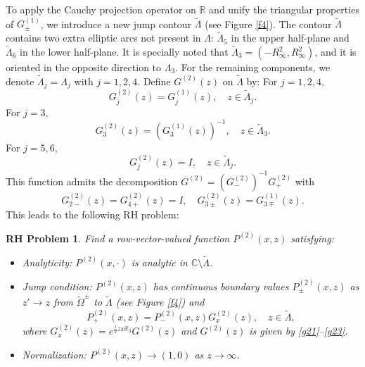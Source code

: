 \documentclass[preprint,compress,12pt]{elsarticle}
\newtheorem{rhp}{RH Problem}
\numberwithin{equation}{section}
\begin{document}
To apply the Cauchy projection operator on $\mathbb{R}$ and unify the triangular properties of $G^{(1)}_{\pm}$, we introduce a new jump contour $\widetilde{\Lambda}$ (see Figure \ref{f4}). The contour $\widetilde{\Lambda}$ contains two extra elliptic arcs not present in $\Lambda$: $\widetilde{\Lambda}_{5}$ in the upper half-plane and $\widetilde{\Lambda}_{6}$ in the lower half-plane. It is specially noted that \(\widetilde{\Lambda}_{3}=\left(-R_{\infty}^{2},R_{\infty}^{2}\right)\), and it is oriented in the opposite direction to $\Lambda_{3}$. For the remaining components, we denote $\widetilde{\Lambda}_{j}=\Lambda_{j}$ with $j=1,2,4$.  Define $G^{(2)}(z)$ on $\widetilde{\Lambda}$ by:
For $j=1,2,4$,
\begin{equation}\label{g21}
G_{j}^{(2)}(z)=G_{j}^{(1)}(z),\quad z\in\widetilde{\Lambda}_{j}.
\end{equation}
For $j=3$,
\begin{equation}\label{g22}
G_{3}^{(2)}(z)=(G_{3}^{(1)}(z))^{-1},\quad z\in\widetilde{\Lambda}_{3}.
\end{equation}
For $j=5,6$,
\begin{equation}\label{g23}
G_{j}^{(2)}(z)=I,\quad z\in\widetilde{\Lambda}_{j}.
\end{equation}
This function admits the decomposition $G^{(2)}=(G^{(2)}_{-})^{-1}G^{(2)}_{+}$ with
\begin{equation}
G_{2-}^{(2)}(z)=G_{4+}^{(2)}(z)=I, \quad G_{3\pm}^{(2)}(z)=G_{3\mp}^{(1)}(z).
\end{equation}
This leads to the following RH problem:
\begin{rhp}\label{RHp2}
Find a row-vector-valued function $P^{(2)}(x,z)$ satisfying:
\begin{itemize}
  \item Analyticity: $P^{(2)}(x,\cdot)$ is analytic in $\mathbb{C}\setminus\widetilde{\Lambda}$.
  \item Jump condition: $P^{(2)}(x,z)$ has continuous boundary values $P^{(2)}_{\pm}(x,z)$ as $z'\rightarrow z$ from $\widetilde{\Omega}^{\pm}$ to $\widetilde{\Lambda}$ (see Figure \ref{f4}) and
      \begin{equation}
      P^{(2)}_{+}(x,z)=P^{(2)}_{-}(x,z)G^{(2)}_{x}(z),\quad z\in\widetilde{\Lambda},
      \end{equation}
      where $G^{(2)}_{x}(z)=e^{\frac{i}{2}zx\widehat{\sigma}_{3}}G^{(2)}(z)$ and $G^{(2)}(z)$  is given by \eqref{g21}--\eqref{g23}.
  \item Normalization: $P^{(2)}(x,z)\rightarrow (1,0)$ as $z\rightarrow\infty$.
\end{itemize}
\end{rhp}
\end{document}
